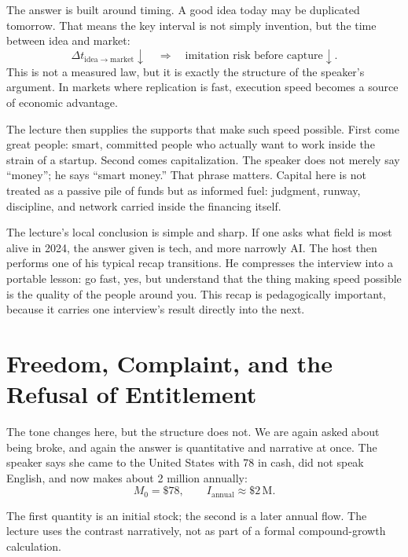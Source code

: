 The answer is built around timing. A good idea today may be duplicated tomorrow. That means the key interval is not simply invention, but the time between idea and market:
\begin{equation}
\Delta t_{\mathrm{idea}\to\mathrm{market}} \downarrow
\quad \Longrightarrow \quad
\text{imitation risk before capture} \downarrow .
\end{equation}
This is not a measured law, but it is exactly the structure of the speaker's argument. In markets where replication is fast, execution speed becomes a source of economic advantage.

The lecture then supplies the supports that make such speed possible. First come great people: smart, committed people who actually want to work inside the strain of a startup. Second comes capitalization. The speaker does not merely say ``money''; he says ``smart money.'' That phrase matters. Capital here is not treated as a passive pile of funds but as informed fuel: judgment, runway, discipline, and network carried inside the financing itself.

The lecture's local conclusion is simple and sharp. If one asks what field is most alive in 2024, the answer given is tech, and more narrowly AI. The host then performs one of his typical recap transitions. He compresses the interview into a portable lesson: go fast, yes, but understand that the thing making speed possible is the quality of the people around you. This recap is pedagogically important, because it carries one interview's result directly into the next.

\section{Freedom, Complaint, and the Refusal of Entitlement}

The tone changes here, but the structure does not. We are again asked about being broke, and again the answer is quantitative and narrative at once. The speaker says she came to the United States with \text{\$}78 in cash, did not speak English, and now makes about \text{\$}2 million annually:
\begin{equation}
M_0 = \text{\$}78,
\qquad
I_{\mathrm{annual}} \approx \text{\$}2\,\mathrm{M}.
\end{equation}

\begin{remark}
The first quantity is an initial stock; the second is a later annual flow. The lecture uses the contrast narratively, not as part of a formal compound-growth calculation.
\end{remark}

